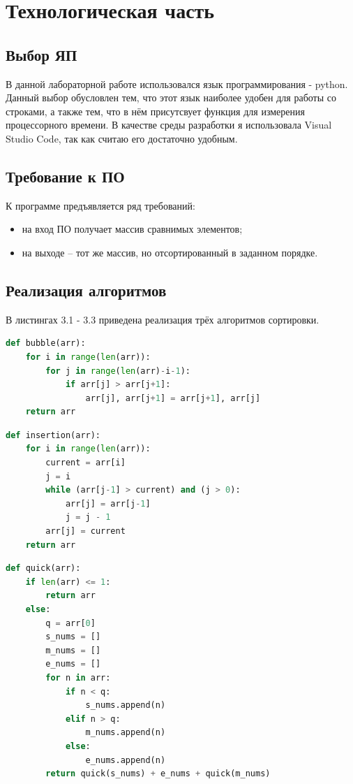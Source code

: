 \documentclass[12pt]{report}
\begin{document}
\chapter{Технологическая часть}

\section{Выбор ЯП}
В данной лабораторной работе использовался язык программирования - python. Данный выбор обусловлен тем, что этот язык наиболее удобен для работы со строками, а также тем, что в нём присутсвует функция для измерения процессорного времени.
В качестве среды разработки я использовала Visual Studio Code, так как считаю его достаточно удобным.

\section{Требование к ПО}
К программе предъявляется ряд требований:

\begin{itemize}
	\item на вход ПО получает массив сравнимых элементов;
	\item на выходе -- тот же массив, но отсортированный в заданном порядке.
\end{itemize}

\section{Реализация алгоритмов}

В листингах 3.1 - 3.3 приведена реализация трёх алгоритмов сортировки.

\begin{lstlisting}[label=some-code,caption=Функция сортировки массива пузырьком,language=Python]
def bubble(arr):
	for i in range(len(arr)):
		for j in range(len(arr)-i-1):
			if arr[j] > arr[j+1]:
				arr[j], arr[j+1] = arr[j+1], arr[j]
	return arr
\end{lstlisting}

\begin{lstlisting}[label=some-code,caption=Функция сортировки массива вставками,language=Python]
def insertion(arr):
	for i in range(len(arr)):
		current = arr[i]
		j = i
		while (arr[j-1] > current) and (j > 0):
			arr[j] = arr[j-1]
			j = j - 1
		arr[j] = current
	return arr
\end{lstlisting}

\begin{lstlisting}[label=some-code,caption=Функция быстрой сортировки,language=Python]
def quick(arr):
	if len(arr) <= 1:
		return arr
	else:
		q = arr[0]
		s_nums = []
		m_nums = []
		e_nums = []
		for n in arr:
			if n < q:
				s_nums.append(n)
			elif n > q:
				m_nums.append(n)
			else:
				e_nums.append(n)
		return quick(s_nums) + e_nums + quick(m_nums)
\end{lstlisting}
\end{document}
